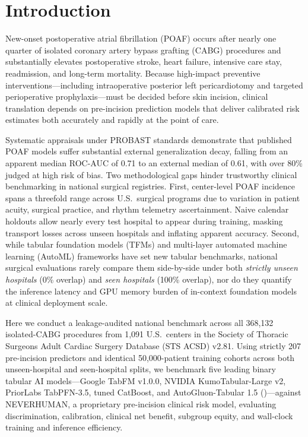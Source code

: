\section{Introduction}

New-onset postoperative atrial fibrillation (POAF) occurs after nearly one quarter of isolated coronary artery bypass grafting (CABG) procedures and substantially elevates postoperative stroke, heart failure, intensive care stay, readmission, and long-term mortality.\cite{aranki1996predictors,villareal2004,elchami2010poaf,lapar2014poaf,dobrev2019postoperative,jawitz2020poaf,caldonazo2023meta} Because high-impact preventive interventions---including intraoperative posterior left pericardiotomy and targeted perioperative prophylaxis---must be decided before skin incision,\cite{gaudino2021palacs,chatterjee2026sts} clinical translation depends on pre-incision prediction models that deliver calibrated risk estimates both accurately and rapidly at the point of care.

Systematic appraisals under PROBAST standards demonstrate that published POAF models suffer substantial external generalization decay, falling from an apparent median ROC-AUC of 0.71 to an external median of 0.61, with over 80\% judged at high risk of bias.\cite{fields2025poaf,lopeztuesta2026poaf,pandey2023poaf,wolff2019probast,moons2025probastai} Two methodological gaps hinder trustworthy clinical benchmarking in national surgical registries. First, center-level POAF incidence spans a threefold range across U.S.\ surgical programs due to variation in patient acuity, surgical practice, and rhythm telemetry ascertainment.\cite{filardo2017telemetry,perezgrovas2023jaha} Naive calendar holdouts allow nearly every test hospital to appear during training, masking transport losses across unseen hospitals and inflating apparent accuracy.\cite{steyerberg2016prediction,riley2019external} Second, while tabular foundation models (TFMs) and multi-layer automated machine learning (AutoML) frameworks have set new tabular benchmarks,\cite{hollmann2025tabpfn,erickson2025tabarena,erickson2020autogluon,jaeger2026tabpfn35,qu2026kumotabular,kong2026tabfm} national surgical evaluations rarely compare them side-by-side under both \emph{strictly unseen hospitals} (0\% overlap) and \emph{seen hospitals} (100\% overlap), nor do they quantify the inference latency and GPU memory burden of in-context foundation models at clinical deployment scale.

Here we conduct a leakage-audited national benchmark across all 368,132 isolated-CABG procedures from 1,091 U.S.\ centers in the Society of Thoracic Surgeons Adult Cardiac Surgery Database (STS ACSD) v2.81.\cite{sts2014v281,shahian2018sts} Using strictly 207 pre-incision predictors and identical 50,000-patient training cohorts across both unseen-hospital and seen-hospital splits, we benchmark five leading binary tabular AI models---Google TabFM v1.0.0, NVIDIA KumoTabular-Large v2, PriorLabs TabPFN-3.5, tuned CatBoost, and AutoGluon-Tabular 1.5 ()---against NEVERHUMAN, a proprietary pre-incision clinical risk model, evaluating discrimination, calibration, clinical net benefit, subgroup equity, and wall-clock training and inference efficiency.
